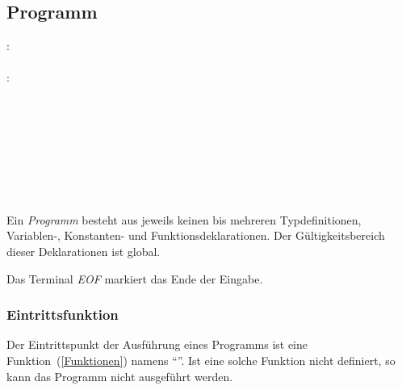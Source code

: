 \subsection{Programm}\label{Programm}
:\label{programm}\\
\hspace*{1cm}   \\
:\label{programm_statements}\\
\hspace*{1cm} \\
\hspace*{1cm}  \\
\hspace*{1cm}  \glq\Gt{;}\grq \\
\hspace*{1cm}  \glq\Gt{;}\grq {} \\
\hspace*{1cm}  \glq\Gt{;}\grq \\
\hspace*{1cm}  \glq\Gt{;}\grq {} \\
\hspace*{1cm}  \glq\Gt{;}\grq \\
\hspace*{1cm}  \glq\Gt{;}\grq {} \\


Ein \emph{Programm} besteht aus jeweils keinen bis mehreren Typdefinitionen, Variablen-, Konstanten- und Funktionsdeklarationen.
Der Gültigkeitsbereich dieser Deklarationen ist global.

\label{EOF} Das Terminal \emph{EOF} markiert das Ende der Eingabe.


\subsubsection{{Eintrittsfunktion}}\label{__Eintrittsfunktion__}
Der Eintrittspunkt der Ausführung eines Programms ist eine Funktion~(\ref{Funktionen}) namens "`"'. Ist eine solche Funktion nicht definiert, so
kann das Programm nicht ausgeführt werden.

